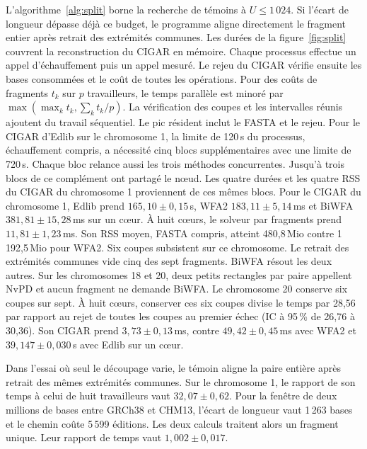L'algorithme~\ref{alg:split} borne la recherche de témoins à \(U\le1\,024\). Si l'écart de longueur dépasse déjà ce budget, le programme aligne directement le fragment entier après retrait des extrémités communes. Les durées de la figure~\ref{fig:split} couvrent la reconstruction du CIGAR en mémoire. Chaque processus effectue un appel d'échauffement puis un appel mesuré. Le rejeu du CIGAR vérifie ensuite les bases consommées et le coût de toutes les opérations. Pour des coûts de fragments \(t_k\) sur \(p\) travailleurs, le temps parallèle est minoré par \(\max(\max_k t_k,\sum_k t_k/p)\). La vérification des coupes et les intervalles réunis ajoutent du travail séquentiel. Le pic résident inclut le FASTA et le rejeu. Pour le CIGAR d'Edlib sur le chromosome 1, la limite de 120\,s du processus, échauffement compris, a nécessité cinq blocs supplémentaires avec une limite de 720\,s. Chaque bloc relance aussi les trois méthodes concurrentes. Jusqu'à trois blocs de ce complément ont partagé le nœud. Les quatre durées et les quatre RSS du CIGAR du chromosome 1 proviennent de ces mêmes blocs.
Pour le CIGAR du chromosome 1, Edlib prend \(165{,}10\pm0{,}15\)\,s, WFA2 \(183{,}11\pm5{,}14\)\,ms et BiWFA \(381{,}81\pm15{,}28\)\,ms sur un cœur. À huit cœurs, le solveur par fragments prend \(11{,}81\pm1{,}23\)\,ms. Son RSS moyen, FASTA compris, atteint 480,8\,Mio contre 1\,192,5\,Mio pour WFA2.
Six coupes subsistent sur ce chromosome. Le retrait des extrémités communes vide cinq des sept fragments. BiWFA résout les deux autres. Sur les chromosomes 18 et 20, deux petits rectangles par paire appellent NvPD et aucun fragment ne demande BiWFA. Le chromosome 20 conserve six coupes sur sept. À huit cœurs, conserver ces six coupes divise le temps par 28,56 par rapport au rejet de toutes les coupes au premier échec (IC à 95\,\% de 26,76 à 30,36). Son CIGAR prend \(3{,}73\pm0{,}13\)\,ms, contre \(49{,}42\pm0{,}45\)\,ms avec WFA2 et \(39{,}147\pm0{,}030\)\,s avec Edlib sur un cœur.

Dans l'essai où seul le découpage varie, le témoin aligne la paire entière après retrait des mêmes extrémités communes. Sur le chromosome 1, le rapport de son temps à celui de huit travailleurs vaut \(32{,}07\pm0{,}62\). Pour la fenêtre de deux millions de bases entre GRCh38 et CHM13, l'écart de longueur vaut 1\,263 bases et le chemin coûte 5\,599 éditions. Les deux calculs traitent alors un fragment unique. Leur rapport de temps vaut \(1{,}002\pm0{,}017\).

